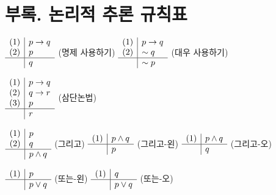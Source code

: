 \chapter*{부록. 논리적 추론 규칙표}

\vspace*{-20px}

\begin{center}
    \(
        \begin{array}{c|l}
            (1) & p \rightarrow q \\ (2) & p \\\hline & q
        \end{array}
    \)
    (명제 사용하기)
    \qquad \qquad
    \(
        \begin{array}{c|l}
            (1) & p \rightarrow q \\ (2) & \sim q \\\hline & \sim p
        \end{array}
    \)
    (대우 사용하기)
\end{center}

\begin{center}
    \(
        \begin{array}{c|l}
            (1) & p \rightarrow q \\ (2) & q \rightarrow r \\ (3) & p \\\hline & r
        \end{array}
    \)
    (삼단논법)
\end{center}

\begin{center}
    \(
        \begin{array}{c|l}
            (1) & p  \\ (2) & q \\\hline & p \wedge q
        \end{array}
    \)
    (그리고)
    \qquad \qquad
    \(
        \begin{array}{c|l}
            (1) & p \wedge q \\\hline & p
        \end{array}
    \)
    (그리고-왼)
    \qquad \qquad
    \(
        \begin{array}{c|l}
            (1) & p \wedge q \\\hline & q
        \end{array}
    \)
    (그리고-오)
\end{center}

\begin{center}
    \(
        \begin{array}{c|l}
            (1) & p \\\hline & p \vee q
        \end{array}
    \)
    (또는-왼)
    \qquad \qquad
    \(
        \begin{array}{c|l}
            (1) & q \\\hline & p \vee q
        \end{array}
    \)
    (또는-오)
\end{center}

